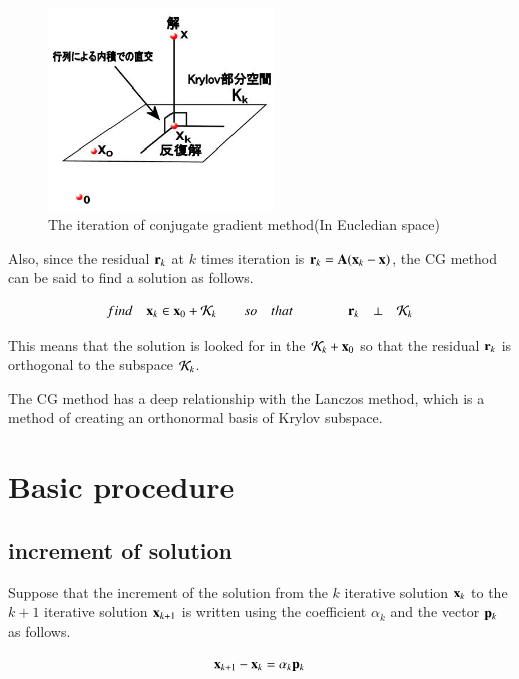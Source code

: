 \begin{figure}
\begin{center}
\includegraphics[width=6cm]{images/cg_projector.eps}
\caption{The iteration of conjugate gradient method(In Eucledian space)}
\end{center}
\end{figure}

Also, since the residual $\mathbf{r}_k$ at $k$ times iteration is $\mathbf{r}_k=\mathbf{A}(\mathbf{x}_k-\mathbf{x})$, the CG method can be said to find a solution as follows.

\begin{equation}
find \quad \mathbf{x}_k\in\mathbf{x}_0+{\cal K}_k \qquad so \quad that \qquad \qquad \mathbf{r}_k\quad\bot\quad{\cal K}_k
\end{equation}


This means that the solution  is looked for in the ${\cal K}_k+\mathbf{x}_0$ so that the residual $\mathbf{r}_k$ is orthogonal to the subspace ${\cal K}_k$.

The CG method has a deep relationship with the Lanczos method, which is a method of creating an orthonormal basis of Krylov subspace.



\section{Basic procedure}


\subsection{increment of solution}


Suppose that the increment of the solution from the $k$ iterative solution $\mathbf{x}_{k}$ to the $k+1$ iterative solution $\mathbf{x}_{k+1}$ is written using the coefficient $\alpha_k$ and the vector $\mathbf{p}_k$ as follows.


\begin{equation}
\mathbf{x}_{k+1}-\mathbf{x}_{k}=\alpha_{k}\mathbf{p}_{k}
\end{equation}


